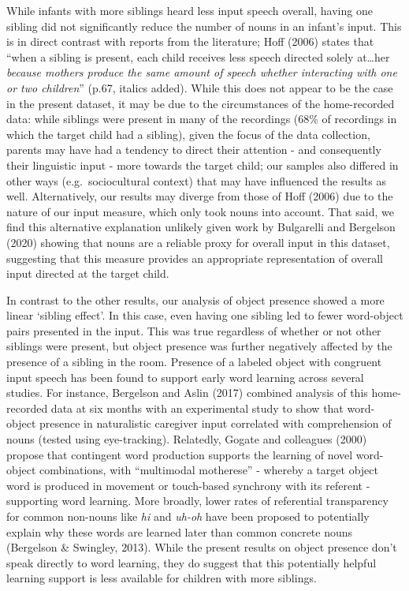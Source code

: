 \documentclass[
  man,mask,floatsintext]{apa6}
\begin{document}
While infants with more siblings heard less input speech overall, having one sibling did not significantly reduce the number of nouns in an infant's input. This is in direct contrast with reports from the literature; Hoff (2006) states that ``when a sibling is present, each child receives less speech directed solely at\ldots her \emph{because mothers produce the same amount of speech whether interacting with one or two children}'' (p.67, italics added). While this does not appear to be the case in the present dataset, it may be due to the circumstances of the home-recorded data: while siblings were present in many of the recordings (68\% of recordings in which the target child had a sibling), given the focus of the data collection, parents may have had a tendency to direct their attention - and consequently their linguistic input - more towards the target child; our samples also differed in other ways (e.g.~sociocultural context) that may have influenced the results as well. Alternatively, our results may diverge from those of Hoff (2006) due to the nature of our input measure, which only took nouns into account. That said, we find this alternative explanation unlikely given work by Bulgarelli and Bergelson (2020) showing that nouns are a reliable proxy for overall input in this dataset, suggesting that this measure provides an appropriate representation of overall input directed at the target child.

In contrast to the other results, our analysis of object presence showed a more linear `sibling effect'. In this case, even having one sibling led to fewer word-object pairs presented in the input. This was true regardless of whether or not other siblings were present, but object presence was further negatively affected by the presence of a sibling in the room. Presence of a labeled object with congruent input speech has been found to support early word learning across several studies. For instance, Bergelson and Aslin (2017) combined analysis of this home-recorded data at six months with an experimental study to show that word-object presence in naturalistic caregiver input correlated with comprehension of nouns (tested using eye-tracking). Relatedly, Gogate and colleagues (2000) propose that contingent word production supports the learning of novel word-object combinations, with ``multimodal motherese'' - whereby a target object word is produced in movement or touch-based synchrony with its referent - supporting word learning. More broadly, lower rates of referential transparency for common non-nouns like \emph{hi} and \emph{uh-oh} have been proposed to potentially explain why these words are learned later than common concrete nouns (Bergelson \& Swingley, 2013). While the present results on object presence don't speak directly to word learning, they do suggest that this potentially helpful learning support is less available for children with more siblings.
\end{document}
